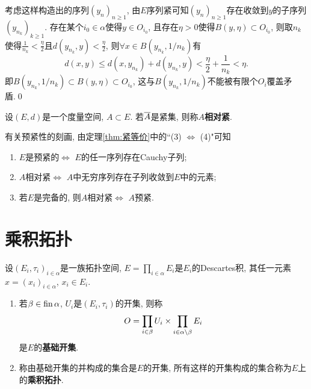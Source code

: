 \begin{Proof}
	考虑这样构造出的序列$ (y_n)_{n\geqslant 1} $, 由$ E $序列紧可知$ (y_n)_{n\geqslant 1} $存在收敛到$ y $的子序列$ (y_{n_k})_{k\geqslant 1} $. 存在某个$ i_0\in\alpha $使得$ y\in O_{i_0} $, 且存在$ \eta>0 $使得$ B(y,\eta)\subset O_{i_0} $, 则取$ n_k $使得$ \frac{1}{n_k}<\frac{\eta}{2} $且$ d(y_{n_k},y)<\frac{\eta}{2} $, 则$ \forall x\in B(y_{n_k},1/n_k) $有
	\[
		d(x,y)\leqslant d(x,y_{n_k})+d(y_{n_k},y)<\frac{\eta}{2}+\frac{1}{n_k}<\eta.
	\]
	即$ B(y_{n_k},1/n_k)\subset B(y,\eta)\subset O_{i_0} $, 这与$ B(y_{n_k},1/n_k) $不能被有限个$ O_i $覆盖矛盾.\qed
\end{Proof}

\begin{Definition}[相对紧]\label{def:相对紧}
	设$ (E,d) $是一个度量空间, $ A\subset E $. 若$ \baro{A} $是紧集, 则称$ A $\textbf{相对紧}.
\end{Definition}

\begin{Remark}\label{rmk:预紧性的刻画}
	有关预紧性的刻画, 由定理\ref{thm:紧等价}中的``(3) $ \Leftrightarrow $ (4)"可知
	\begin{enumerate}[(1)]
		\item $ E $是预紧的$ \Longleftrightarrow $ $ E $的任一序列存在Cauchy子列;

		\item $ A $相对紧$ \Longleftrightarrow $ $ A $中无穷序列存在子列收敛到$ E $中的元素;

		\item 若$ E $是完备的, 则$ A $相对紧$ \Longleftrightarrow $ $ A $预紧.
	\end{enumerate}
\end{Remark}

\section{乘积拓扑}

\begin{Definition}[乘积拓扑]\label{def:乘积拓扑}
	设$ (E_i,\tau_i)_{i\in\alpha} $是一族拓扑空间, $ E=\prod\limits_{i\in\alpha}E_i $是$ E_i $的Descartes积, 其任一元素$ x=(x_i)_{i\in\alpha} $, $ x_i\in E_i $.
	\begin{enumerate}[(1)]
		\item 若$ \beta\in\fin\alpha $, $ U_i $是$ (E_i,\tau_i) $的开集, 则称
		      \[
			      O=\prod_{i\in\beta}U_i\times\prod_{i\in\alpha\sm\beta}E_i
		      \]
		      是$ E $的\textbf{基础开集}.

		\item\label{item:乘积拓扑任意并} 称由基础开集的并构成的集合是$ E $的开集, 所有这样的开集构成的集合称为$ E $上的\textbf{乘积拓扑}.
	\end{enumerate}
\end{Definition}

